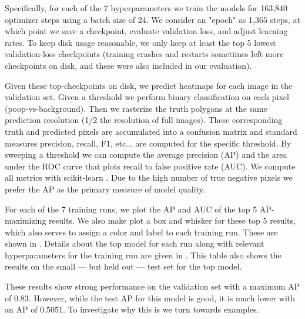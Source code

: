 \documentclass[10pt,twocolumn,letterpaper]{article}
\begin{document}
\begin{comment}
    SeeAlso:
    ~/code/shitspotter/experiments/run_pixel_eval_pipeline.sh
    python ~/code/shitspotter/dev/poc/estimate_train_resources.py
\end{comment}

Specifically, for each of the 7 hyperparameters we train the models for 163,840
optimizer steps using a batch size of 24. We consider an "epoch" as 1,365
steps, at which point we save a checkpoint, evaluate validation loss, and
adjust learning rates. To keep disk usage reasonable, we only keep at least the
top 5 lowest validation-loss checkpoints (training crashes and restarts
sometimes left more checkpoints on disk, and these were also included in our
evaluation).

Given these top-checkpoints on disk, we predict heatmaps for each image in the
validation set. Given a threshold we perform binary classification on each
pixel (poop-vs-background).  Then we rasterize the truth polygons at the same
prediction resolution (1/2 the resolution of full images). These corresponding
truth and predicted pixels are accumulated into a confusion matrix and 
standard measures precision, recall, F1, etc... \cite{powers_evaluation_2011} 
are computed for the specific threshold. By sweeping a threshold we can
compute the average precision (AP) and the area under the ROC curve that plots
recall to false positive rate (AUC). We compute all metrics with scikit-learn
\cite{scikit-learn}. Due to the high number of true negative pixels we prefer
the AP as the primary measure of model quality.


For each of the 7 training runs, we plot the AP and AUC of the top 5
AP-maximizing results. We also make plot a box and whisker for these top 5
results, which also serves to assign a color and label to each training run.
These are shown in . Details about the top model for
each run along with relevant hyperparameters for the training run are given in
. This table also shows the results on the
small --- but held out --- test set for the top model.

These results show strong performance on the validation set with a maximum AP
of $0.83$. However, while the test AP for this model is good, it is much lower
with an AP of $0.5051$. To investigate why this is we turn towards examples.
\end{document}
